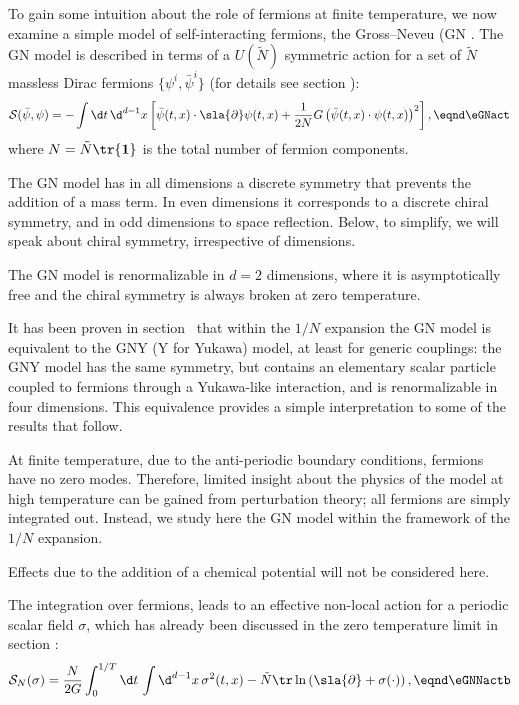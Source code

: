 To gain some intuition about the role of fermions at finite temperature, we now
examine a simple model of self-interacting fermions, the Gross--Neveu (GN .  The GN model is described in terms of a $U(\tilde N)$ symmetric action for a
set of $\tilde N$ massless Dirac fermions $\{\psi^i, \bar\psi^i \}$ (for details see section \ssNGNmod): \sslbl\ssGNNFT
$${\cal S} (\bar \psib, \psib )= -\int \d t\,\d^{d-1} x \left[
\bar\psib(t,x)\cdot \sla{ \partial} \psib(t,x) +\frac{1}{2N} G\left(\bar\psib(t,x)\cdot \psib(t,x) \right)^2
\right],\eqnd\eGNact $$
where $N=\tilde N\tr{\bf 1}$   is the total number of fermion components. \par
The GN model has in all dimensions a discrete symmetry  that prevents the addition of a mass term.
In even dimensions it corresponds to a discrete chiral symmetry, and in odd
dimensions to space reflection. Below, to simplify, we
will speak about chiral symmetry, irrespective of dimensions.  \par
The GN model is renormalizable in $d=2$ dimensions, where it is asymptotically
free and the chiral symmetry is always broken at zero temperature.  \par
It has been proven in section \sssGNYN\ that within the
$1/N$ expansion the GN model is equivalent to the GNY (Y for Yukawa)
model, at least for generic couplings: the GNY model has the same symmetry, but contains an elementary
scalar particle  coupled to fermions through a
Yukawa-like interaction, and is renormalizable in four dimensions. This
equivalence provides a simple interpretation to some of the results that
follow. \par
At finite temperature, due to the anti-periodic boundary conditions, fermions
have no zero modes. Therefore, limited insight about
the physics of the model at high  temperature can be gained from
perturbation theory; all fermions
are simply integrated out. Instead, we study here the GN model within the
framework of the $1/N$ expansion.   \par
Effects due to the addition of a chemical potential will
not be considered here. \par  %
The integration over fermions,
leads to an effective non-local action for a periodic scalar field $\sigma $,
which has already been discussed in the zero temperature limit  in section
\sssGNYN:
$$ {\cal S}_N (\sigma )={N\over2 G}\int_0^{1/T} \d t\, \int
\d^{d-1} x \,
\sigma^2(t,x) -\tilde N\tr \ln\left(\sla{ \partial}+\sigma(\cdot) \right), \eqnd\eGNNactb $$
